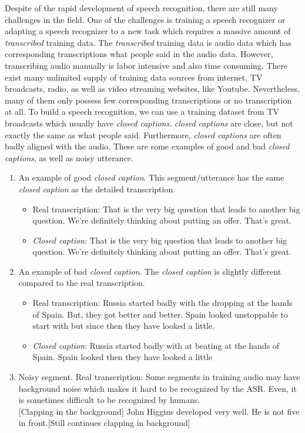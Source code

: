 Despite of the rapid development of speech recognition, there are still many challenges in the field. One of the challenges is training a speech recognizer or adapting a speech recognizer to a new task which requires a massive amount of \textit{transcribed} training data. The \textit{transcribed} training data is audio data which has corresponding transcriptions what people said in the audio data. However, transcribing audio manually is labor intensive and also time consuming. There exist many unlimited supply of training data sources from internet, TV broadcasts, radio, as well as video streaming websites, like Youtube.  Nevertheless, many of them only possess few corresponding transcriptions or no transcription at all. To build a speech recognition, we can use a training dataset from TV broadcasts which usually have \textit{closed captions}. \textit{closed captions} are close, but not exactly the same as what people said. Furthermore, \textit{closed captions} are often badly aligned with the audio. These are some examples of good and bad \textit{closed captions},  as well as noisy utterance.
\begin{enumerate}
\item An example of good \textit{closed caption}. This segment/utterance has the same \textit{closed caption} as the detailed transcription.  
\begin{itemize}
\item Real transcription: \tab That is the very big question that leads to another big question. We're definitely thinking about putting an offer. That's great. 
\item \textit{Closed caption}:  \tab That is the very big question that leads to another big question. We're definitely thinking about putting an offer. That's great.
\end{itemize}


\item An example of bad \textit{closed caption}. The \textit{closed caption} is slightly different compared to the real transcription.
\begin{itemize}
\item Real transcription: \tab Russia started badly with the dropping at the hands of Spain. But, they got better and better. Spain looked unstoppable to start with but since then they have looked a little.
\item \textit{Closed caption}: \tab Russia started badly with at beating at the hands of Spain. Spain looked then they have looked a little
\end{itemize}


\item Noisy segment. Real transcription: Some segments in training audio may have background noise which makes it hard to be recognized by the ASR. Even, it is sometimes difficult to be recognized by humans. \\

[Clapping in the background] John Higgins developed very well. He is not five in front.[Still continues clapping in background]

\end{enumerate}

